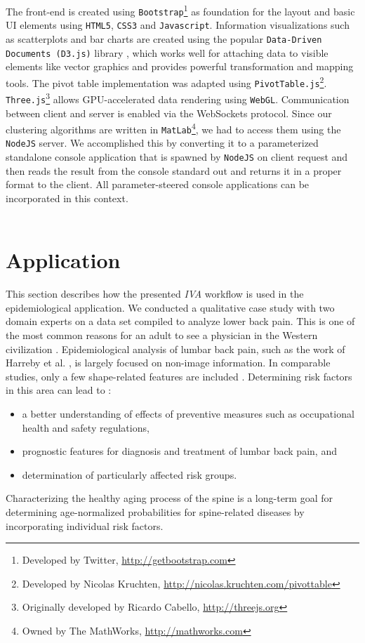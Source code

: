 \documentclass[journal]{style/vgtc} 			          %
\begin{document}
The front-end is created using \texttt{Bootstrap}\footnote{Developed by Twitter, \url{http://getbootstrap.com}} as foundation for the layout and basic UI elements using \texttt{HTML5}, \texttt{CSS3} and \texttt{Javascript}.
%
Information visualizations such as scatterplots and bar charts are created using the popular \texttt{Data-Driven Documents (D3.js)} library \cite{D3}, which works well for attaching data to visible elements like vector graphics and provides powerful transformation and mapping tools.
%
The pivot table implementation was adapted using \texttt{PivotTable.js}\footnote{Developed by Nicolas Kruchten, \url{http://nicolas.kruchten.com/pivottable}}.
%
\texttt{Three.js}\footnote{Originally developed by Ricardo Cabello, \url{http://threejs.org}} allows GPU-accelerated data rendering using \texttt{WebGL}.
%
Communication between client and server is enabled via the WebSockets protocol.
%
Since our clustering algorithms are written in \texttt{MatLab}\footnote{Owned by The MathWorks, \url{http://mathworks.com}}, we had to access them using the \texttt{NodeJS} server.
%
We accomplished this by converting it to a parameterized standalone console application that is spawned by \texttt{NodeJS} on client request and then reads the result from the console standard out and returns it in a proper format to the client.
%
All parameter-steered console applications can be incorporated in this context.
\\\\
\section{Application} \label{application}
This section describes how the presented \emph{IVA} workflow is used in the epidemiological application.
%
We conducted a qualitative case study with two domain experts on a data set compiled to analyze lower back pain. 
%
This is one of the most common reasons for an adult to see a physician in the Western civilization \cite{Backpain}.
%
Epidemiological analysis of lumbar back pain, such as the work of Harreby et al. \cite{Harreby1996}, is largely focused on non-image information.
%
In comparable studies, only a few shape-related features are included \cite{Lang2011}.
%
%
Determining risk factors in this area can lead to \cite{Fletcher2012}:
\begin{itemize}
	\item a better understanding of effects of preventive measures such as occupational health and safety regulations,
	\item prognostic features for diagnosis and treatment of lumbar back pain, and
	\item determination of particularly affected risk groups.
\end{itemize}
%
Characterizing the healthy aging process of the spine is a long-term goal for determining age-normalized probabilities for spine-related diseases by incorporating individual risk factors.
%
\end{document}
